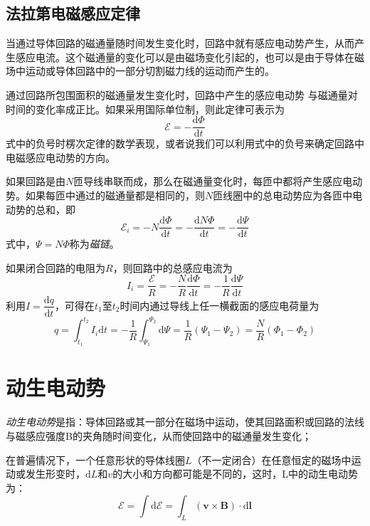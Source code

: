 \documentclass[12pt]{article}
\newcommand{\rmd}{\mathrm{d}}
\newcommand{\deriv}[2]{\frac{\rmd #1}{\rmd #2}}
\newcommand{\dderiv}[2]{\dfrac{\rmd #1}{\rmd #2}}
\begin{document}
\subsection{法拉第电磁感应定律}

当通过导体回路的磁通量随时间发生变化时，回路中就有感应电动势产生，从而产生感应电流。这个磁通量的变化可以是由磁场变化引起的，也可以是由于导体在磁场中运动或导体回路中的一部分切割磁力线的运动而产生的。

通过回路所包围面积的磁通量发生变化时，回路中产生的感应电动势 与磁通量对时间的变化率成正比。如果采用国际单位制，则此定律可表示为
\begin{equation}
    \mathscr{E} = - \deriv{\Phi}{t}
\end{equation}
式中的负号时楞次定律的数学表现，或者说我们可以利用式中的负号来确定回路中电磁感应电动势的方向。

如果回路是由\(N\)匝导线串联而成，那么在磁通量变化时，每匝中都将产生感应电动势。如果每匝中通过的磁通量都是相同的，则\(N\)匝线圈中的总电动势应为各匝中电动势的总和，即
\begin{equation}
    \mathscr{E}_i = - N \deriv{\varPhi}{t} = -\deriv{N \varPhi}{t} = -\deriv{\varPsi}{t}
\end{equation}
式中，\(\varPsi = N \varPhi\)称为\emph{磁链}。

如果闭合回路的电阻为\(R\)，则回路中的总感应电流为
\begin{equation}
    I_i = \frac{\mathscr{E}}{R} = -\frac{N}{R} \deriv{\varPhi}{t} = -\frac{1}{R} \deriv{\varPsi}{t}
\end{equation}
利用\(I = \dderiv{q}{t}\)，可得在\(t_1\)至\(t_2\)时间内通过导线上任一横截面的感应电荷量为
\begin{equation}
    q = \int_{t_1}^{t_2} I_i \rmd t = -\frac{1}{R} \int_{\varPsi_1}^{\varPsi_2} \rmd \varPsi = \frac{1}{R} \left(\varPsi_1 - \varPsi_2\right)= \frac{N}{R} \left(\varPhi_1 - \varPhi_2\right)
\end{equation}

\section{动生电动势}

\emph{动生电动势}是指：导体回路或其一部分在磁场中运动，使其回路面积或回路的法线与磁感应强度B的夹角随时间变化，从而使回路中的磁通量发生变化；

在普遍情况下，一个任意形状的导体线圈\(L\)（不一定闭合）在任意恒定的磁场中运动或发生形变时，\(\rmd L\)和\(v\)的大小和方向都可能是不同的，这时，L中的动生电动势为：
\begin{equation}
    \mathscr{E} = \int \rmd \mathscr{E} = \int_L \left(\boldsymbol{v} \times \boldsymbol{B}\right) \cdot \rmd \boldsymbol{l}
\end{equation}
\end{document}
